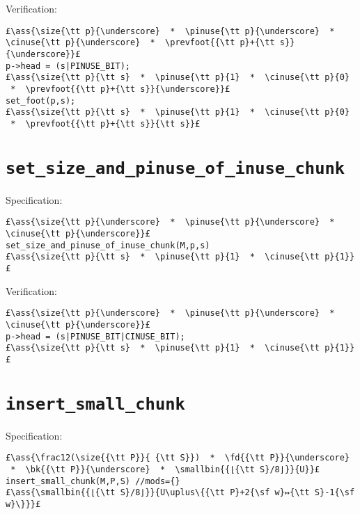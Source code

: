 \documentclass[10pt,a4paper,twoside]{report}
\makeatletter
\newcommand{\ml}[2][t]{\mbox{\mdseries\begin{tabular}[#1]{@{}L@{}}#2\end{tabular}}}
\newcommand{\ass}[1]{\ensuremath{{\color{blue}\left\{\ml[c]{#1}\right\}}}}
\makeatother
\begin{document}
\noindent Verification:
\begin{lstlisting}
£\ass{\size{\tt p}{\underscore}  *  \pinuse{\tt p}{\underscore}  *  \cinuse{\tt p}{\underscore}  *  \prevfoot{{\tt p}+{\tt s}}{\underscore}}£
p->head = (s|PINUSE_BIT);
£\ass{\size{\tt p}{\tt s}  *  \pinuse{\tt p}{1}  *  \cinuse{\tt p}{0}  *  \prevfoot{{\tt p}+{\tt s}}{\underscore}}£
set_foot(p,s);
£\ass{\size{\tt p}{\tt s}  *  \pinuse{\tt p}{1}  *  \cinuse{\tt p}{0}  *  \prevfoot{{\tt p}+{\tt s}}{\tt s}}£
\end{lstlisting}

\section{\tt set\_size\_and\_pinuse\_of\_inuse\_chunk}

Specification:
\begin{lstlisting}
£\ass{\size{\tt p}{\underscore}  *  \pinuse{\tt p}{\underscore}  *  \cinuse{\tt p}{\underscore}}£
set_size_and_pinuse_of_inuse_chunk(M,p,s)
£\ass{\size{\tt p}{\tt s}  *  \pinuse{\tt p}{1}  *  \cinuse{\tt p}{1}}£
\end{lstlisting}

\noindent Verification:
\begin{lstlisting}
£\ass{\size{\tt p}{\underscore}  *  \pinuse{\tt p}{\underscore}  *  \cinuse{\tt p}{\underscore}}£
p->head = (s|PINUSE_BIT|CINUSE_BIT);
£\ass{\size{\tt p}{\tt s}  *  \pinuse{\tt p}{1}  *  \cinuse{\tt p}{1}}£
\end{lstlisting}


\section{\tt insert\_small\_chunk}

Specification:
\begin{lstlisting}
£\ass{\frac12(\size{{\tt P}}{ {\tt S}})  *  \fd{{\tt P}}{\underscore}  *  \bk{{\tt P}}{\underscore}  *  \smallbin{{⌊{\tt S}/8⌋}}{U}}£
insert_small_chunk(M,P,S) //mods={}
£\ass{\smallbin{{⌊{\tt S}/8⌋}}{U\uplus\{{\tt P}+2{\sf w}↦{\tt S}-1{\sf w}\}}}£
\end{lstlisting}
\end{document}
